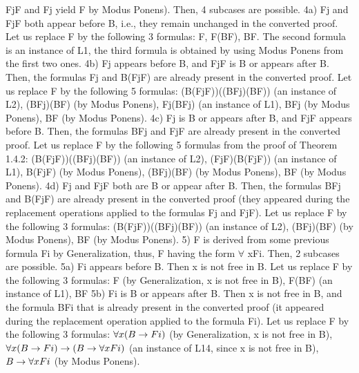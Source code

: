 Fj\IMPLIES F and Fj yield F by Modus Ponens). Then, 4 subcases are possible.
4a) Fj and Fj\IMPLIES F both appear before B, i.e., they remain unchanged in the converted proof. Let us replace
F by the following 3 formulas: F, F\IMPLIES (B\IMPLIES F), B\IMPLIES F. The second formula is an instance of L1, the third
formula is obtained by using Modus Ponens from the first two ones.
4b) Fj appears before B, and Fj\IMPLIES F is B or appears after B. Then, the formulas Fj and B\IMPLIES (Fj\IMPLIES F) are
already present in the converted proof. Let us replace F by the following 5 formulas:
(B\IMPLIES (Fj\IMPLIES F))\IMPLIES ((B\IMPLIES Fj)\IMPLIES (B\IMPLIES F)) (an instance of L2),
(B\IMPLIES Fj)\IMPLIES (B\IMPLIES F) (by Modus Ponens),
Fj\IMPLIES (B\IMPLIES Fj) (an instance of L1),
B\IMPLIES Fj (by Modus Ponens),
B\IMPLIES F (by Modus Ponens).
4c) Fj is B or appears after B, and Fj\IMPLIES F appears before B. Then, the formulas B\IMPLIES Fj and Fj\IMPLIES F are
already present in the converted proof. Let us replace F by the following 5 formulas from the proof of
Theorem 1.4.2:
(B\IMPLIES (Fj\IMPLIES F))\IMPLIES ((B\IMPLIES Fj)\IMPLIES (B\IMPLIES F)) (an instance of L2),
(Fj\IMPLIES F)\IMPLIES (B\IMPLIES (Fj\IMPLIES F)) (an instance of L1),
B\IMPLIES (Fj\IMPLIES F) (by Modus Ponens),
(B\IMPLIES Fj)\IMPLIES (B\IMPLIES F) (by Modus Ponens),
B\IMPLIES F (by Modus Ponens).
4d) Fj and Fj\IMPLIES F both are B or appear after B. Then, the formulas B\IMPLIES Fj and B\IMPLIES (Fj\IMPLIES F) are already
present in the converted proof (they appeared during the replacement operations applied to the formulas
Fj and Fj\IMPLIES F). Let us replace F by the following 3 formulas:
(B\IMPLIES (Fj\IMPLIES F))\IMPLIES ((B\IMPLIES Fj)\IMPLIES (B\IMPLIES F)) (an instance of L2),
(B\IMPLIES Fj)\IMPLIES (B\IMPLIES F) (by Modus Ponens),
B\IMPLIES F (by Modus Ponens).
5) F is derived from some previous formula Fi by Generalization, thus, F having the form \(\forall\) xFi. Then, 2
subcases are possible.
5a) Fi appears before B. Then x is not free in B. Let us replace F by the following 3 formulas:
F (by Generalization, x is not free in B),
F\IMPLIES (B\IMPLIES F) (an instance of L1),
B\IMPLIES F
5b) Fi is B or appears after B. Then x is not free in B, and the formula B\IMPLIES Fi that is already present in the
converted proof (it appeared during the replacement operation applied to the formula Fi). Let us replace F
by the following 3 formulas:
\(\forall x(B\rightarrow Fi)\) (by Generalization, x is not free in B),
\(\forall x(B\rightarrow Fi)\rightarrow (B\rightarrow \forall xFi)\) (an instance of L14, since x is not free in B),
\(B\rightarrow \forall xFi\) (by Modus Ponens).

